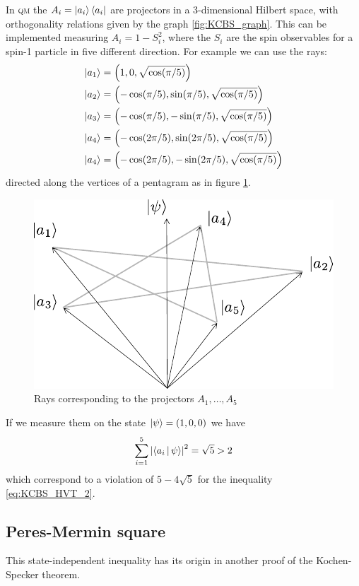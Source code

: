 \documentclass[a4paper]{article}
\newcommand{\acron}[1]{\textsc{#1}}
\newcommand{\QM}{\acron{qm}}
\theoremstyle{definition}
\begin{document}
In \QM{} the $A_i = \Ket{a_i}\Bra{a_i}$ are projectors in a 3-dimensional
Hilbert space, with orthogonality relations given by the graph
\ref{fig:KCBS_graph}.
This can be implemented measuring $A_i = 1 - S_i^2$,
where the $S_i$ are the spin observables for a spin-1 particle in five
different direction.
For example we can use the rays:
\begin{align}
    \Ket{a_1} &= \left(1,0,\sqrt{\cos(\pi/5)}\right) \\
    \Ket{a_2} &= \left(-\cos(\pi/5),\sin(\pi/5),\sqrt{\cos(\pi/5)}\right)\\ 
    \Ket{a_3} &=\left(-\cos(\pi/5),-\sin(\pi/5),\sqrt{\cos(\pi/5)}\right)\\
    \Ket{a_4} &= \left(-\cos(2\pi/5),\sin(2\pi/5),\sqrt{\cos(\pi/5)}\right)\\
    \Ket{a_4} &=\left(-\cos(2\pi/5),-\sin(2\pi/5),\sqrt{\cos(\pi/5)}\right)\\
    \label{eq:KCBS_rays}
\end{align}
directed along the vertices of a pentagram as in figure \ref{fig:KCBS_pent}.
\begin{figure}[h]
    \centering
    \includegraphics[width=.7\textwidth]{KCBS_pent.pdf}
    \caption{Rays corresponding to the projectors $A_1,\ldots,A_5$ }
    \label{fig:KCBS_pent}
\end{figure}
If we measure them on the state $\Ket{\psi} = (1,0,0)$ we have
\begin{equation}
    \sum_{i=1}^5 \left|\Braket{a_i|\psi}\right|^2 = \sqrt{5} > 2
    \label{eq:KCBS_QM_1}
\end{equation}
which correspond to a violation of $5-4\sqrt{5}$ for the inequality
\eqref{eq:KCBS_HVT_2}.
\subsection{Peres-Mermin square}
\label{sec:PM_square}
This state-independent inequality has its origin in another proof of the
Kochen-Specker theorem.
\end{document}
